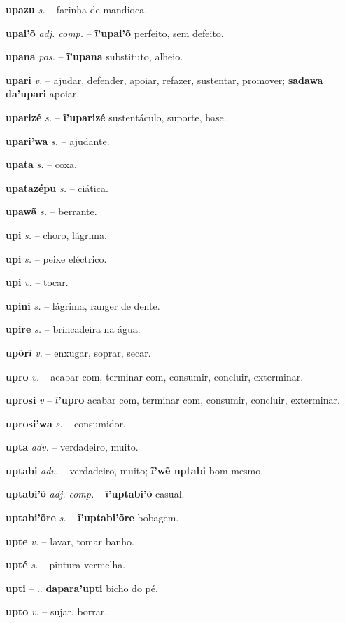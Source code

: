 \textbf{upazu} \textit{s.} -- farinha de mandioca.

\textbf{upai'õ} \textit{adj. comp.} -- \textbf{ĩ'upai'õ} perfeito, sem defeito.

\textbf{upana} \textit{pos.} -- \textbf{ĩ'upana} substituto, alheio.

\textbf{upari} \textit{v.} -- ajudar, defender, apoiar, refazer, sustentar, promover; \textbf{sadawa da'upari} apoiar.

\textbf{uparizé} \textit{s.} -- \textbf{ĩ'uparizé} sustentáculo, suporte, base.

\textbf{upari'wa} \textit{s.} -- ajudante.

\textbf{upata} \textit{s.} -- coxa.

\textbf{upatazépu} \textit{s.} -- ciática.

\textbf{upawã} \textit{s.} -- berrante.

\textbf{upi} \textit{s.} -- choro, lágrima.

\textbf{upi} \textit{s.} -- peixe eléctrico.

\textbf{upi} \textit{v.} -- tocar.

\textbf{upini} \textit{s.} -- lágrima, ranger de dente.

\textbf{upire} \textit{s.} -- brincadeira na água.

\textbf{upõrĩ} \textit{v.} -- enxugar, soprar, secar.

\textbf{upro} \textit{v.} -- acabar com, terminar com, consumir, concluir, exterminar.

\textbf{uprosi} \textit{v} -- \textbf{ĩ'upro} acabar com, terminar com, consumir, concluir, exterminar.

\textbf{uprosi'wa} \textit{s.} -- consumidor.

\textbf{upta} \textit{adv.} -- verdadeiro, muito.

\textbf{uptabi} \textit{adv.} -- verdadeiro, muito; \textbf{ĩ'wẽ uptabi} bom mesmo.

\textbf{uptabi'õ} \textit{adj. comp.} -- \textbf{ĩ'uptabi'õ} casual.

\textbf{uptabi'õre} \textit{s.} -- \textbf{ĩ'uptabi'õre} bobagem.

\textbf{upte} \textit{v.} -- lavar, tomar banho.

\textbf{upté} \textit{s.} -- pintura vermelha.

\textbf{upti} \textit{} -- .. \textbf{dapara'upti} bicho do pé.

\textbf{upto} \textit{v.} -- sujar, borrar.

